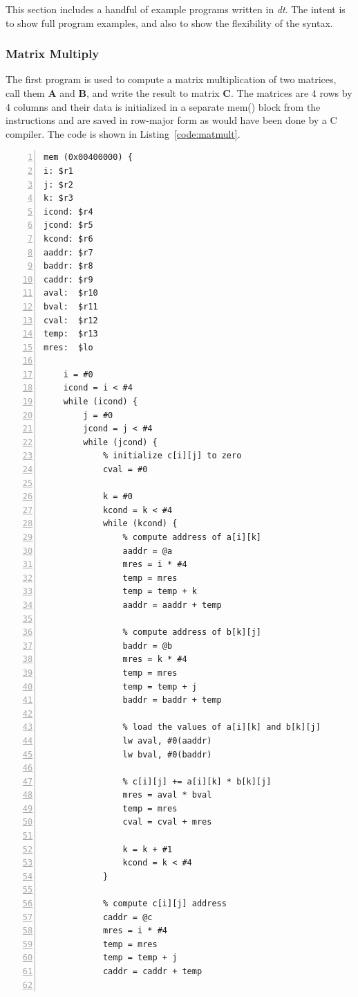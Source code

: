 This section includes a handful of example programs written in \emph{dt}.
The intent is to show full program examples, and also to show 
the flexibility of the syntax.

\subsubsection{Matrix Multiply}
The first program is used to compute a matrix multiplication of 
two matrices, call them \textbf{A} and \textbf{B}, and write the 
result to matrix \textbf{C}.  The matrices are
4 rows by 4 columns and their data is initialized in a 
separate mem() block from the instructions and are saved 
in row-major form as would have been done by a C compiler.  The code is 
shown in Listing~\ref{code:matmult}.


\begin{lstlisting}[label=code:matmult,caption=Matrix multiplication example source code,basicstyle=\footnotesize,numbers=left,numberstyle=\tiny,stepnumber=1, numbersep=6pt,frame=single,captionpos=b,escapechar=`]
mem (0x00400000) {
i: $r1
j: $r2
k: $r3
icond: $r4
jcond: $r5
kcond: $r6
aaddr: $r7
baddr: $r8
caddr: $r9
aval:  $r10
bval:  $r11
cval:  $r12
temp:  $r13
mres:  $lo

    i = #0
    icond = i < #4
    while (icond) {
        j = #0
        jcond = j < #4
        while (jcond) {
            % initialize c[i][j] to zero
            cval = #0

            k = #0
            kcond = k < #4
            while (kcond) {
                % compute address of a[i][k]
                aaddr = @a
                mres = i * #4
                temp = mres
                temp = temp + k
                aaddr = aaddr + temp

                % compute address of b[k][j]
                baddr = @b
                mres = k * #4
                temp = mres
                temp = temp + j
                baddr = baddr + temp

                % load the values of a[i][k] and b[k][j]
                lw aval, #0(aaddr)
                lw bval, #0(baddr)

                % c[i][j] += a[i][k] * b[k][j]
                mres = aval * bval
                temp = mres
                cval = cval + mres

                k = k + #1
                kcond = k < #4
            }

            % compute c[i][j] address 
            caddr = @c
            mres = i * #4
            temp = mres
            temp = temp + j
            caddr = caddr + temp


\end{lstlisting}
